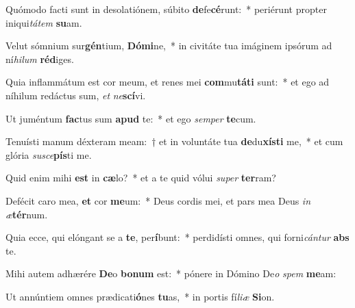 \item Quómodo facti sunt in desolatiónem, súbito \textbf{de}fe\textbf{cé}runt:~* periérunt propter iniqui\textit{tá}\textit{tem} \textbf{su}am.
\item Velut sómnium sur\textbf{gén}tium, \textbf{Dó}\textbf{mi}ne,~* in civitáte tua imáginem ipsórum ad ní\textit{hi}\textit{lum} \textbf{réd}iges.
\item Quia inflammátum est cor meum, et renes mei \textbf{com}mu\textbf{tá}\textbf{ti} sunt:~* et ego ad níhilum redáctus sum, \textit{et} \textit{ne}\textbf{scí}vi.
\item Ut juméntum \textbf{fac}tus sum \textbf{a}\textbf{pud} te:~* et ego \textit{sem}\textit{per} \textbf{te}cum.
\item Tenuísti manum déxteram meam:~† et in voluntáte tua \textbf{de}du\textbf{xís}\textbf{ti} me,~* et cum glória \textit{su}\textit{sce}\textbf{pís}ti me.
\item Quid enim mihi \textbf{est} in \textbf{cæ}lo?~* et a te quid vólui \textit{su}\textit{per} \textbf{ter}ram?
\item Defécit caro mea, \textbf{et} cor \textbf{me}um:~* Deus cordis mei, et pars mea Deus \textit{in} \textit{æ}\textbf{tér}num.
\item Quia ecce, qui elóngant se a \textbf{te}, per\textbf{í}bunt:~* perdidísti omnes, qui forni\textit{cán}\textit{tur} \textbf{abs} te.
\item Mihi autem adhærére \textbf{De}o \textbf{bo}\textbf{num} est:~* pónere in Dómino De\textit{o} \textit{spem} \textbf{me}am:
\item Ut annúntiem omnes prædicati\textbf{ó}nes \textbf{tu}as,~* in portis fí\textit{li}\textit{æ} \textbf{Si}on.
